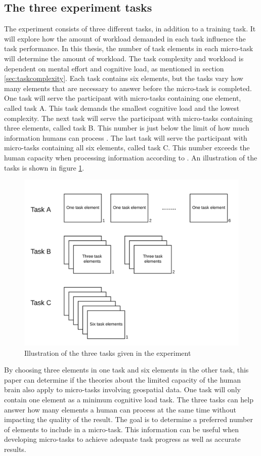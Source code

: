 \subsection{The three experiment tasks}\label{sec:experimenttasks}
The experiment consists of three different tasks, in addition to a training task. It will explore how the amount of workload demanded in each task influence the task performance. In this thesis, the number of task elements in each micro-task will determine the amount of workload. The task complexity and workload is dependent on mental effort and cognitive load, as mentioned in section \ref{sec:taskcomplexity}. Each task contains six elements, but the tasks vary how many elements that are necessary to answer before the micro-task is completed. One task will serve the participant with micro-tasks containing one element, called task A. This task demands the smallest cognitive load and the lowest complexity. The next task will serve the participant with micro-tasks containing three elements, called task B. This number is just below the limit of how much information humans can process \citep{Mandler2013}. The last task will serve the participant with micro-tasks containing all six elements, called task C. This number exceeds the human capacity when processing information according to \cite{Leppink2014a}. An illustration of the tasks is shown in figure \ref{fig:illustrationmicrotasks}.

\begin{figure}[H]
	\centering
	\includegraphics[width=0.7\linewidth]{fig/illustration_microtasks}
	\caption{Illustration of the three tasks given in the experiment}
	\label{fig:illustrationmicrotasks}
\end{figure}

By choosing three elements in one task and six elements in the other task, this paper can determine if the theories about the limited capacity of the human brain also apply to micro-tasks involving geospatial data. One task will only contain one element as a minimum cognitive load task. The three tasks can help answer how many elements a human can process at the same time without impacting the quality of the result. The goal is to determine a preferred number of elements to include in a micro-task. This information can be useful when developing micro-tasks to achieve adequate task progress as well as accurate results.

